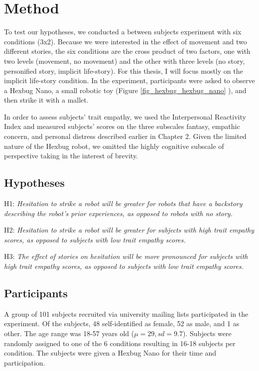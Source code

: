 \section{Method}
To test our hypotheses, we conducted a between subjects experiment with six conditions (3x2). Because we were interested in the effect of movement and two different stories, the six conditions are the cross product of two factors, one with two levels (movement, no movement) and the other with three levels (no story, personified story, implicit life-story). For this thesis, I will focus mostly on the implicit life-story condition. In the experiment, participants were asked to observe a Hexbug Nano, a small robotic toy (Figure \ref{fig_hexbug_hexbug_nano} ), and then strike it with a mallet.

In order to assess subjects' trait empathy, we used the Interpersonal Reactivity Index and measured subjects' scores on the three subscales fantasy, empathic concern, and personal distress described earlier in Chapter 2. Given the limited nature of the Hexbug robot, we omitted the highly cognitive subscale of perspective taking in the interest of brevity. 

\subsection{Hypotheses}

H1: \emph{Hesitation to strike a robot will be greater for robots that have a backstory describing the robot's prior experiences, as opposed to robots with no story.}

H2: \emph{Hesitation to strike a robot will be greater for subjects with high trait empathy scores, as opposed to subjects with low trait empathy scores.}

H3: \emph{The effect of stories on hesitation will be more pronounced for subjects with high trait empathy scores, as opposed to subjects with low trait empathy scores.}

\subsection{Participants}


A group of 101 subjects recruited via university mailing lists participated in the experiment. Of the subjects, 48 self-identified as female, 52 as male, and 1 as other. The age range was 18-57 years old ($\mu=29, sd=9.7$). Subjects were randomly assigned to one of the 6 conditions resulting in 16-18 subjects per condition. The subjects were given a Hexbug Nano for their time and participation. 


